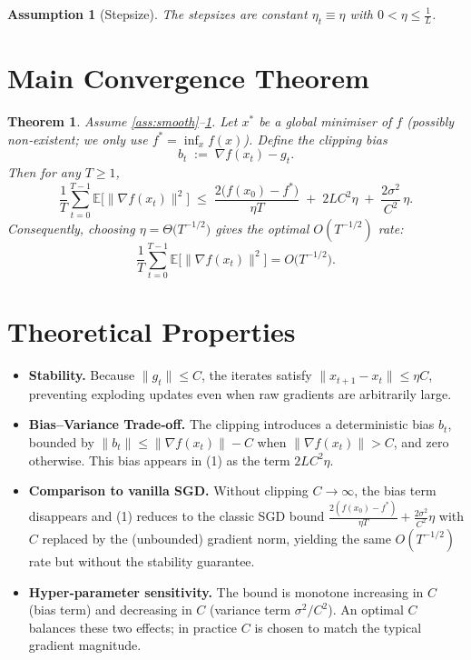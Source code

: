 \documentclass{article}
\newtheorem{theorem}{Theorem}
\newtheorem{assumption}{Assumption}
\newcommand{\E}{\mathbb{E}}
\begin{document}
\begin{assumption}[Stepsize]\label{ass:stepsize}
The stepsizes are constant $\eta_{t}\equiv\eta$ with $0<\eta\le\frac{1}{L}$.
\end{assumption}

\section*{Main Convergence Theorem}
\begin{theorem}\label{thm:main}
Assume \ref{ass:smooth}–\ref{ass:stepsize}. Let $x^{*}$ be a global minimiser of $f$ (possibly non‑existent; we only use $f^{*}= \inf_{x}f(x)$).  
Define the \emph{clipping bias}
\[
b_{t}\;:=\;\nabla f(x_{t})-g_{t}.
\]
Then for any $T\ge1$,
\[
\frac{1}{T}\sum_{t=0}^{T-1}\E\!\bigl[\|\nabla f(x_{t})\|^{2}\bigr]
\;\le\;
\frac{2\bigl(f(x_{0})-f^{*}\bigr)}{\eta T}
\;+\;
2L C^{2}\eta
\;+\;
\frac{2\sigma^{2}}{C^{2}}\,\eta .
\tag{1}
\]
Consequently, choosing $\eta=\Theta\!\bigl(T^{-1/2}\bigr)$ gives the optimal $O(T^{-1/2})$ rate:
\[
\frac{1}{T}\sum_{t=0}^{T-1}\E\!\bigl[\|\nabla f(x_{t})\|^{2}\bigr]
=O\!\bigl(T^{-1/2}\bigr).
\]
\end{theorem}

\section*{Theoretical Properties}
\begin{itemize}
\item \textbf{Stability.} Because $\|g_{t}\|\le C$, the iterates satisfy $\|x_{t+1}-x_{t}\|\le\eta C$, preventing exploding updates even when raw gradients are arbitrarily large.
\item \textbf{Bias–Variance Trade‑off.} The clipping introduces a deterministic bias $b_{t}$, bounded by $\|b_{t}\|\le \|\nabla f(x_{t})\|-C$ when $\|\nabla f(x_{t})\|>C$, and zero otherwise. This bias appears in (1) as the term $2LC^{2}\eta$.
\item \textbf{Comparison to vanilla SGD.} Without clipping $C\to\infty$, the bias term disappears and (1) reduces to the classic SGD bound $\frac{2(f(x_{0})-f^{*})}{\eta T}+ \frac{2\sigma^{2}}{C^{2}}\eta$ with $C$ replaced by the (unbounded) gradient norm, yielding the same $O(T^{-1/2})$ rate but without the stability guarantee.
\item \textbf{Hyper‑parameter sensitivity.} The bound is monotone increasing in $C$ (bias term) and decreasing in $C$ (variance term $\sigma^{2}/C^{2}$). An optimal $C$ balances these two effects; in practice $C$ is chosen to match the typical gradient magnitude.
\end{itemize}
\end{document}
